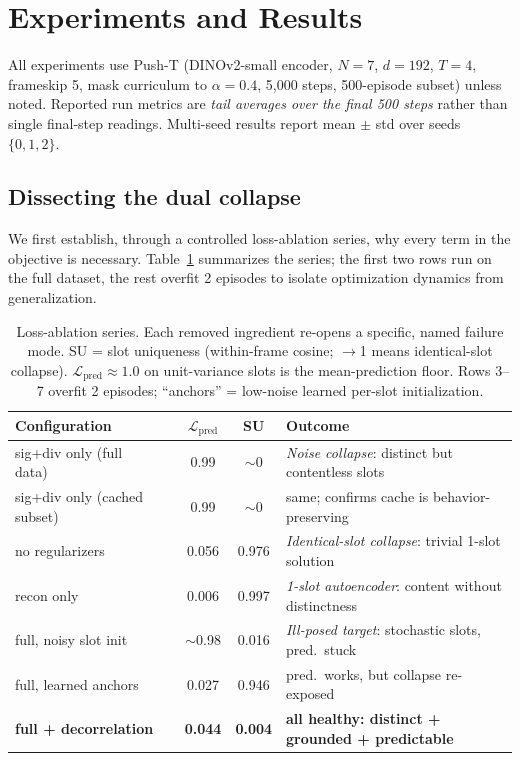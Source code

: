 \documentclass[12pt]{article}
\begin{document}
\section{Experiments and Results}
\label{sec:results}

All experiments use Push-T (DINOv2-small encoder, $N{=}7$, $d{=}192$, $T{=}4$, frameskip 5, mask curriculum to $\alpha{=}0.4$, 5{,}000 steps, 500-episode subset) unless noted. Reported run metrics are \emph{tail averages over the final 500 steps} rather than single final-step readings. Multi-seed results report mean $\pm$ std over seeds $\{0,1,2\}$.

\subsection{Dissecting the dual collapse}
\label{sec:collapse}

We first establish, through a controlled loss-ablation series, why every term in the objective is necessary. Table~\ref{tab:collapse} summarizes the series; the first two rows run on the full dataset, the rest overfit 2 episodes to isolate optimization dynamics from generalization.

\begin{table}[t]
\centering
\caption{Loss-ablation series. Each removed ingredient re-opens a specific, named failure mode. SU = slot uniqueness (within-frame cosine; $\rightarrow$1 means identical-slot collapse). $\mathcal{L}_{\text{pred}} \approx 1.0$ on unit-variance slots is the mean-prediction floor. Rows 3--7 overfit 2 episodes; ``anchors'' = low-noise learned per-slot initialization.}
\small
\begin{tabular}{@{}llccl@{}}
\toprule
\textbf{Configuration} & & $\mathcal{L}_{\text{pred}}$ & \textbf{SU} & \textbf{Outcome} \\
\midrule
sig+div only (full data) & & 0.99 & $\sim$0 & \emph{Noise collapse}: distinct but contentless slots \\
sig+div only (cached subset) & & 0.99 & $\sim$0 & same; confirms cache is behavior-preserving \\
no regularizers & & 0.056 & 0.976 & \emph{Identical-slot collapse}: trivial 1-slot solution \\
recon only & & 0.006 & 0.997 & \emph{1-slot autoencoder}: content without distinctness \\
full, noisy slot init & & $\sim$0.98 & 0.016 & \emph{Ill-posed target}: stochastic slots, pred.\ stuck \\
full, learned anchors & & 0.027 & 0.946 & pred.\ works, but collapse re-exposed \\
\textbf{full + decorrelation} & & \textbf{0.044} & \textbf{0.004} & \textbf{all healthy: distinct + grounded + predictable} \\
\bottomrule
\end{tabular}
\label{tab:collapse}
\end{table}
\end{document}
